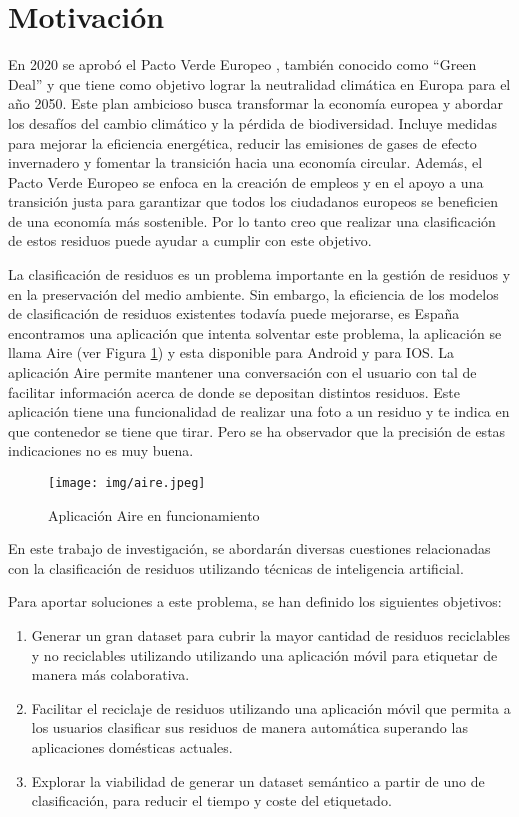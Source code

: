 \documentclass[10pt,a4paper,twocolumn,twoside]{article}
\begin{document}
\section{Motivación}

En 2020 se aprobó el Pacto Verde Europeo \cite{green-deal}, también conocido como ``Green Deal'' y que tiene como objetivo lograr la neutralidad climática en Europa para el año 2050. Este plan ambicioso busca transformar la economía europea y abordar los desafíos del cambio climático y la pérdida de biodiversidad. Incluye medidas para mejorar la eficiencia energética, reducir las emisiones de gases de efecto invernadero y fomentar la transición hacia una economía circular. Además, el Pacto Verde Europeo se enfoca en la creación de empleos y en el apoyo a una transición justa para garantizar que todos los ciudadanos europeos se beneficien de una economía más sostenible.
Por lo tanto creo que realizar una clasificación de estos residuos puede ayudar a cumplir con este objetivo.

La clasificación de residuos es un problema importante en la gestión de residuos y en la preservación del medio ambiente. Sin embargo, la eficiencia de los modelos de clasificación de residuos existentes todavía puede mejorarse, es España encontramos una aplicación que intenta solventar este problema, la aplicación se
llama Aire (ver Figura \ref{fig:aire}) y esta disponible para Android y para IOS. La aplicación Aire permite mantener una conversación
con el usuario con tal de facilitar información acerca de donde se depositan distintos residuos. Este aplicación tiene
una funcionalidad de realizar una foto a un residuo y te indica en que contenedor se tiene que tirar. Pero se ha observador
que la precisión de estas indicaciones no es muy buena.

\begin{figure}[h]
  \centering
  \texttt{[image: img/aire.jpeg]}
  \caption{Aplicación Aire en funcionamiento}
  \label{fig:aire}
\end{figure}

En este trabajo de investigación, se abordarán diversas cuestiones relacionadas con la clasificación de residuos utilizando técnicas de inteligencia artificial.

Para aportar soluciones a este problema, se han definido los siguientes objetivos:

\begin{enumerate}
\item Generar un gran dataset para cubrir la mayor cantidad de residuos reciclables y no reciclables utilizando utilizando una aplicación móvil para etiquetar de manera más colaborativa.
\item Facilitar el reciclaje de residuos utilizando una aplicación móvil que permita a los usuarios clasificar sus residuos de manera automática superando las aplicaciones domésticas actuales.
\item Explorar la viabilidad de generar un dataset semántico a partir de uno de clasificación, para reducir el tiempo y coste del etiquetado.
\end{enumerate}
\end{document}
